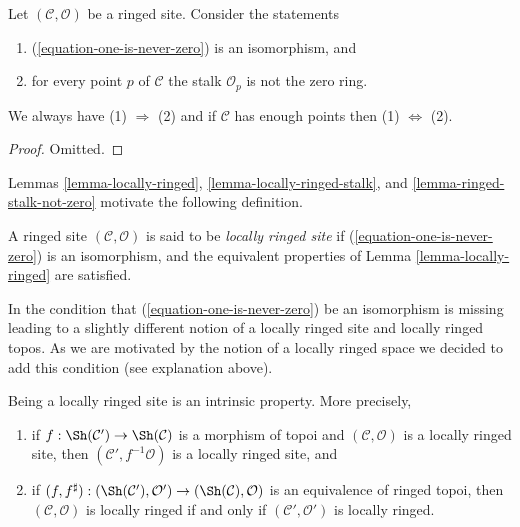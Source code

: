 \begin{lemma}
\label{lemma-ringed-stalk-not-zero}
Let $(\mathcal{C}, \mathcal{O})$ be a ringed site. Consider the statements
\begin{enumerate}
\item (\ref{equation-one-is-never-zero}) is an isomorphism, and
\item for every point $p$ of $\mathcal{C}$ the stalk $\mathcal{O}_p$
is not the zero ring.
\end{enumerate}
We always have (1) $\Rightarrow$ (2) and if $\mathcal{C}$ has enough points
then (1) $\Leftrightarrow$ (2).
\end{lemma}

\begin{proof}
Omitted.
\end{proof}

\noindent
Lemmas \ref{lemma-locally-ringed},
\ref{lemma-locally-ringed-stalk}, and
\ref{lemma-ringed-stalk-not-zero}
motivate the following definition.

\begin{definition}
\label{definition-locally-ringed}
A ringed site $(\mathcal{C}, \mathcal{O})$ is said to be
{\it locally ringed site} if (\ref{equation-one-is-never-zero})
is an isomorphism, and the equivalent properties of
Lemma \ref{lemma-locally-ringed}
are satisfied.
\end{definition}

\noindent
In \cite[Expos\'e IV, Exercice 13.9]{SGA4} the condition that
(\ref{equation-one-is-never-zero}) be an isomorphism is missing leading to
a slightly different notion of a locally ringed site and locally ringed
topos. As we are motivated by the notion of a locally ringed space we decided
to add this condition (see explanation above).

\begin{lemma}
\label{lemma-locally-ringed-intrinsic}
Being a locally ringed site is an intrinsic property.
More precisely,
\begin{enumerate}
\item if $f : \Sh(\mathcal{C}') \to \Sh(\mathcal{C})$
is a morphism of topoi and $(\mathcal{C}, \mathcal{O})$ is
a locally ringed site, then $(\mathcal{C}', f^{-1}\mathcal{O})$
is a locally ringed site, and
\item if
$(f, f^\sharp) : (\Sh(\mathcal{C}'), \mathcal{O}')
\to (\Sh(\mathcal{C}), \mathcal{O})$
is an equivalence of ringed topoi, then
$(\mathcal{C}, \mathcal{O})$ is locally ringed if and only if
$(\mathcal{C}', \mathcal{O}')$
is locally ringed.
\end{enumerate}
\end{lemma}

